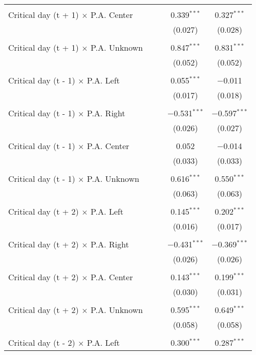 \documentclass[
]{article}
\begin{document}
\begin{table}[!htbp]
{\begin{tabular}{@{\extracolsep{5pt}}lcccc}
  & & & & \\ 
 Critical day (t + 1) $\times$ P.A. Center &  &  & 0.339$^{***}$ & 0.327$^{***}$ \\ 
  &  &  & (0.027) & (0.028) \\ 
  & & & & \\ 
 Critical day (t + 1) $\times$ P.A. Unknown &  &  & 0.847$^{***}$ & 0.831$^{***}$ \\ 
  &  &  & (0.052) & (0.052) \\ 
  & & & & \\ 
 Critical day (t - 1) $\times$ P.A. Left &  &  & 0.055$^{***}$ & $-$0.011 \\ 
  &  &  & (0.017) & (0.018) \\ 
  & & & & \\ 
 Critical day (t - 1) $\times$ P.A. Right &  &  & $-$0.531$^{***}$ & $-$0.597$^{***}$ \\ 
  &  &  & (0.026) & (0.027) \\ 
  & & & & \\ 
 Critical day (t - 1) $\times$ P.A. Center &  &  & 0.052 & $-$0.014 \\ 
  &  &  & (0.033) & (0.033) \\ 
  & & & & \\ 
 Critical day (t - 1) $\times$ P.A. Unknown &  &  & 0.616$^{***}$ & 0.550$^{***}$ \\ 
  &  &  & (0.063) & (0.063) \\ 
  & & & & \\ 
 Critical day (t + 2) $\times$ P.A. Left &  &  & 0.145$^{***}$ & 0.202$^{***}$ \\ 
  &  &  & (0.016) & (0.017) \\ 
  & & & & \\ 
 Critical day (t + 2) $\times$ P.A. Right &  &  & $-$0.431$^{***}$ & $-$0.369$^{***}$ \\ 
  &  &  & (0.026) & (0.026) \\ 
  & & & & \\ 
 Critical day (t + 2) $\times$ P.A. Center &  &  & 0.143$^{***}$ & 0.199$^{***}$ \\ 
  &  &  & (0.030) & (0.031) \\ 
  & & & & \\ 
 Critical day (t + 2) $\times$ P.A. Unknown &  &  & 0.595$^{***}$ & 0.649$^{***}$ \\ 
  &  &  & (0.058) & (0.058) \\ 
  & & & & \\ 
 Critical day (t - 2) $\times$ P.A. Left &  &  & 0.300$^{***}$ & 0.287$^{***}$ \\ 

\end{tabular}}
\end{table}
\end{document}

